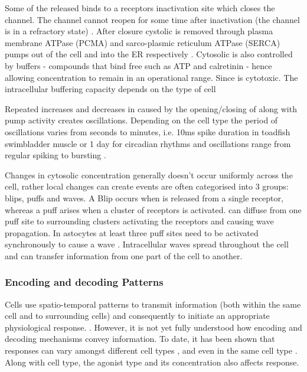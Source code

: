 \documentclass[../main.tex]{subfiles}
\begin{document}
Some of the released  binds to a receptors inactivation site which closes the channel. The channel cannot reopen for some time after inactivation (the channel is in a refractory state) \cite{Sneyd_2005, Lodish_1995}. After  closure cystolic  is removed through plasma membrane ATPase (PCMA) and sarco-plasmic reticulum ATPase (SERCA) pumps out of the cell and into the ER respectively \cite{Berridge_2007}. %
Cytosolic  is also controlled by buffers - compounds that bind free  such as ATP and calretinin - hence allowing  concentration to remain in an operational range. Since  is cytotoxic. The intracellular  buffering capacity depends on the type of cell \cite{Fewtrell_1993, Berridge_2003, Gilabert_2012}

Repeated increases and decreases in  caused by the opening/closing of  along with  pump activity creates  oscillations. Depending on the cell type the period of oscillations varies from seconds to minutes, i.e. 10ms spike duration in toadfish swimbladder muscle or 1 day  for circadian rhythms \cite{Evans_2001, Boulware_2008} and oscillations range from regular spiking to bursting \cite{Dupont_2003}.


Changes in cytosolic  concentration generally doesn't occur uniformly across the cell, rather local  changes can create 
 events are often categorised into 3 groups: blips, puffs and waves. A Blip occurs when  is released from a single receptor, whereas a puff arises when a cluster of receptors is activated.  can diffuse from one puff site to surrounding clusters activating the receptors and causing wave propagation. In astocytes at least three puff sites need to be activated synchronously to cause a wave \cite{Croft_2016}. Intracellular  waves spread throughout the cell and can transfer information from one part of the cell to another.  


\subsubsection{Encoding and decoding  Patterns}
Cells use spatio-temporal patterns to transmit information (both within the same cell and to surrounding cells) \cite{Petersen_1991,  Dolmetsch_1998, Politi_2006} and consequently to initiate an appropriate physiological response. \cite{Uhlen_2010, Berridge_1998}. However, it is not yet fully understood how encoding and decoding mechanisms convey information. To date, it has been shown that  responses can vary amongst different cell types \cite{Berridge_1988}, and even in the same cell type \cite{Rooney_1989}. Along with cell type, the agonist type \cite{Rooney_1989, Cornell-Bell_1990, Larsen_2004} and its concentration \cite{Berridge_1988} also affects  response. 
\end{document}
